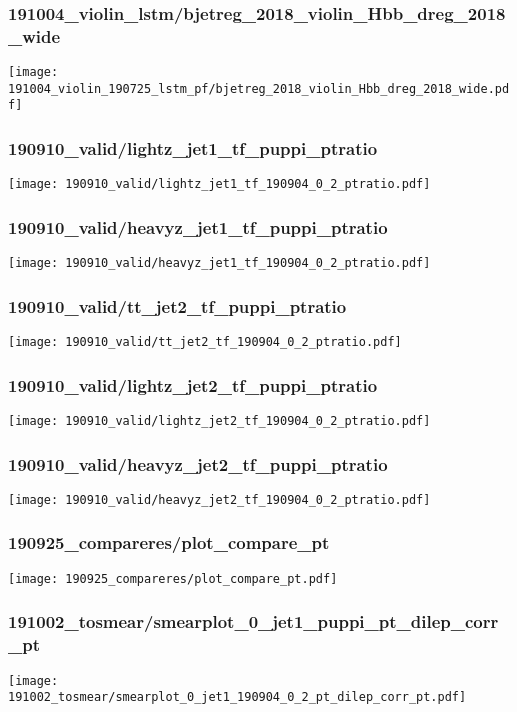 \begin{frame}
   \frametitle{\small 191004\_violin\_lstm/bjetreg\_2018\_violin\_Hbb\_dreg\_2018\_wide}
   \centering
   \texttt{[image: 191004\_violin\_190725\_lstm\_pf/bjetreg\_2018\_violin\_Hbb\_dreg\_2018\_wide.pdf]}
\end{frame}

\begin{frame}
   \frametitle{\small 190910\_valid/lightz\_jet1\_tf\_puppi\_ptratio}
   \centering
   \texttt{[image: 190910\_valid/lightz\_jet1\_tf\_190904\_0\_2\_ptratio.pdf]}
\end{frame}

\begin{frame}
   \frametitle{\small 190910\_valid/heavyz\_jet1\_tf\_puppi\_ptratio}
   \centering
   \texttt{[image: 190910\_valid/heavyz\_jet1\_tf\_190904\_0\_2\_ptratio.pdf]}
\end{frame}

\begin{frame}
   \frametitle{\small 190910\_valid/tt\_jet2\_tf\_puppi\_ptratio}
   \centering
   \texttt{[image: 190910\_valid/tt\_jet2\_tf\_190904\_0\_2\_ptratio.pdf]}
\end{frame}

\begin{frame}
   \frametitle{\small 190910\_valid/lightz\_jet2\_tf\_puppi\_ptratio}
   \centering
   \texttt{[image: 190910\_valid/lightz\_jet2\_tf\_190904\_0\_2\_ptratio.pdf]}
\end{frame}

\begin{frame}
   \frametitle{\small 190910\_valid/heavyz\_jet2\_tf\_puppi\_ptratio}
   \centering
   \texttt{[image: 190910\_valid/heavyz\_jet2\_tf\_190904\_0\_2\_ptratio.pdf]}
\end{frame}

\begin{frame}
   \frametitle{\small 190925\_compareres/plot\_compare\_pt}
   \centering
   \texttt{[image: 190925\_compareres/plot\_compare\_pt.pdf]}
\end{frame}

\begin{frame}
   \frametitle{\small 191002\_tosmear/smearplot\_0\_jet1\_puppi\_pt\_dilep\_corr\_pt}
   \centering
   \texttt{[image: 191002\_tosmear/smearplot\_0\_jet1\_190904\_0\_2\_pt\_dilep\_corr\_pt.pdf]}
\end{frame}

